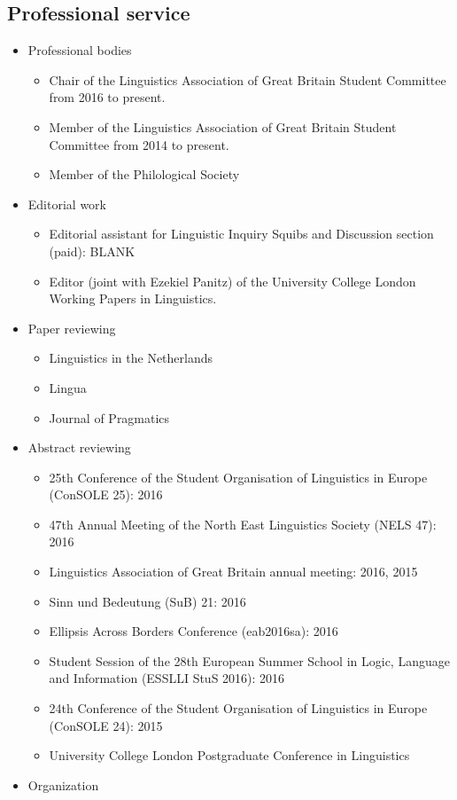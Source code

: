 \documentclass[]{article}
\providecommand{\tightlist}{%
  \setlength{\itemsep}{0pt}\setlength{\parskip}{0pt}}
\begin{document}
\subsection{Professional service}\label{professional-service}

\begin{itemize}
\tightlist
\item
  Professional bodies

  \begin{itemize}
  \tightlist
  \item
    Chair of the Linguistics Association of Great Britain Student
    Committee from 2016 to present.
  \item
    Member of the Linguistics Association of Great Britain Student
    Committee from 2014 to present.
  \item
    Member of the Philological Society
  \end{itemize}
\item
  Editorial work

  \begin{itemize}
  \tightlist
  \item
    Editorial assistant for Linguistic Inquiry Squibs and Discussion
    section (paid): BLANK
  \item
    Editor (joint with Ezekiel Panitz) of the University College London
    Working Papers in Linguistics.
  \end{itemize}
\item
  Paper reviewing

  \begin{itemize}
  \tightlist
  \item
    Linguistics in the Netherlands
  \item
    Lingua
  \item
    Journal of Pragmatics
  \end{itemize}
\item
  Abstract reviewing

  \begin{itemize}
  \tightlist
  \item
    25th Conference of the Student Organisation of Linguistics in Europe
    (ConSOLE 25): 2016
  \item
    47th Annual Meeting of the North East Linguistics Society (NELS 47):
    2016
  \item
    Linguistics Association of Great Britain annual meeting: 2016, 2015
  \item
    Sinn und Bedeutung (SuB) 21: 2016
  \item
    Ellipsis Across Borders Conference (eab2016sa): 2016
  \item
    Student Session of the 28th European Summer School in Logic,
    Language and Information (ESSLLI StuS 2016): 2016
  \item
    24th Conference of the Student Organisation of Linguistics in Europe
    (ConSOLE 24): 2015
  \item
    University College London Postgraduate Conference in Linguistics
  \end{itemize}
\item
  Organization


\end{itemize}
\end{document}

